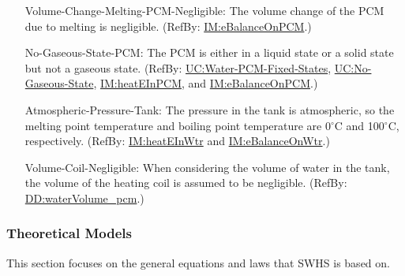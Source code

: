 \documentclass[12pt]{article}
\begin{document}
\begin{itemize}
\item[Volume-Change-Melting-PCM-Negligible:\phantomsection\label{assumpVCMPN}]{The volume change of the PCM due to melting is negligible. (RefBy: \hyperref[IM:eBalanceOnPCM]{IM:eBalanceOnPCM}.)}
\item[No-Gaseous-State-PCM:\phantomsection\label{assumpNGSP}]{The PCM is either in a liquid state or a solid state but not a gaseous state. (RefBy: \hyperref[unlikeChgWPFS]{UC:Water-PCM-Fixed-States}, \hyperref[unlikeChgNGS]{UC:No-Gaseous-State}, \hyperref[IM:heatEInPCM]{IM:heatEInPCM}, and \hyperref[IM:eBalanceOnPCM]{IM:eBalanceOnPCM}.)}
\item[Atmospheric-Pressure-Tank:\phantomsection\label{assumpAPT}]{The pressure in the tank is atmospheric, so the melting point temperature and boiling point temperature are 0${{}^{\circ}\text{C}}$ and 100${{}^{\circ}\text{C}}$, respectively. (RefBy: \hyperref[IM:heatEInWtr]{IM:heatEInWtr} and \hyperref[IM:eBalanceOnWtr]{IM:eBalanceOnWtr}.)}
\item[Volume-Coil-Negligible:\phantomsection\label{assumpVCN}]{When considering the volume of water in the tank, the volume of the heating coil is assumed to be negligible. (RefBy: \hyperref[DD:waterVolume.pcm]{DD:waterVolume\_pcm}.)}
\end{itemize}
\subsubsection{Theoretical Models}
\label{Sec:TMs}
This section focuses on the general equations and laws that SWHS is based on.
\end{document}
